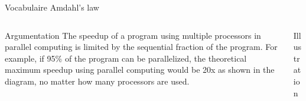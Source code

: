 
\begin{Frame}{Vocabulaire Amdahl's law}
  \begin{columns}[t]
    \begin{column}{\BW} %
      \begin{block}{Argumentation}
        The speedup of a program using multiple processors in parallel
        computing is limited by the sequential fraction of the
        program. For example, if 95\% of the program can be
        parallelized, the theoretical maximum speedup using parallel
        computing would be 20x as shown in the diagram, no matter how
        many processors are used.  
\end{block}
    \end{column}
    
    \begin{column}{5cm} %
      \begin{block}{Illustration}
      \end{block}   
    \end{column}
  \end{columns}  
\end{Frame}


